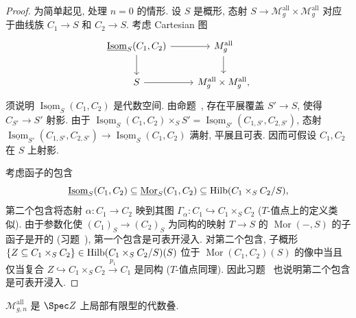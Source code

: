 \begin{proof}
为简单起见, 处理 $n=0$ 的情形. 设 $S$ 是概形, 态射 $S\to\mathcal M_g^{\mathrm{all}}\times\mathcal M_g^{\mathrm{all}}$ 对应于曲线族 $C_1\to\allowbreak S$ 和 $C_2\to\allowbreak S$. 考虑 Cartesian 图
\[
\begin{tikzcd}
\underline{\operatorname{Isom}}_S(C_1,C_2)\arrow[r]\arrow[d]&\mathcal M_g^{\mathrm{all}}\arrow[d]\\
S\arrow[r]&\mathcal M_g^{\mathrm{all}}\times\mathcal M_g^{\mathrm{all}},
\end{tikzcd}
\]
须说明 $\underline{\operatorname{Isom}}_S(C_1,\allowbreak C_2)$ 是代数空间. 由命题~, 存在平展覆盖 $S'\to\allowbreak S$, 使得 $C_{S'}\to\allowbreak S'$ 射影. 由于 $\underline{\operatorname{Isom}}_S(C_1,\allowbreak C_2)\times_S S'=\underline{\operatorname{Isom}}_{S'}(C_{1,\allowbreak S'},\allowbreak C_{2,\allowbreak S'})$, 态射 $\underline{\operatorname{Isom}}_{S'}(C_{1,\allowbreak S'},\allowbreak C_{2,\allowbreak S'})\to\underline{\operatorname{Isom}}_S(C_1,\allowbreak C_2)$ 满射, 平展且可表. 因而可假设 $C_1,\allowbreak C_2$ 在 $S$ 上射影.

考虑函子的包含
\[
\underline{\operatorname{Isom}}_S(C_1,C_2)\subseteq\underline{\operatorname{Mor}}_S(C_1,C_2)\subseteq\operatorname{Hilb}(C_1\times_S C_2/S),
\]
第二个包含将态射 $\alpha:C_1\to\allowbreak C_2$ 映到其图 $\Gamma_\alpha:C_1\hookrightarrow C_1\times_S C_2$ ($T$-值点上的定义类似). 由于参数化使 $(C_1)_S\to(C_2)_S$ 为同构的映射 $T\to\allowbreak S$ 的 $\operatorname{Mor}(-,\allowbreak S)$ 的子函子是开的 (习题~), 第一个包含是可表开浸入. 对第二个包含, 子概形 $\{Z\subseteq C_1\times_S C_2\}\in\operatorname{Hilb}(C_1\times_S C_2/S)(S)$ 位于 $\operatorname{Mor}(C_1,\allowbreak C_2)(S)$ 的像中当且仅当复合 $Z\hookrightarrow C_1\times_S C_2\xrightarrow{p_1}C_1$ 是同构 ($T$-值点同理). 因此习题~ 也说明第二个包含是可表开浸入.
\end{proof}
\begin{theorem}\label{src:6.4.6}
$\mathcal M_{g,\allowbreak n}^{\mathrm{all}}$ 是 $\Spec\mathbb Z$ 上局部有限型的代数叠.
\end{theorem}
